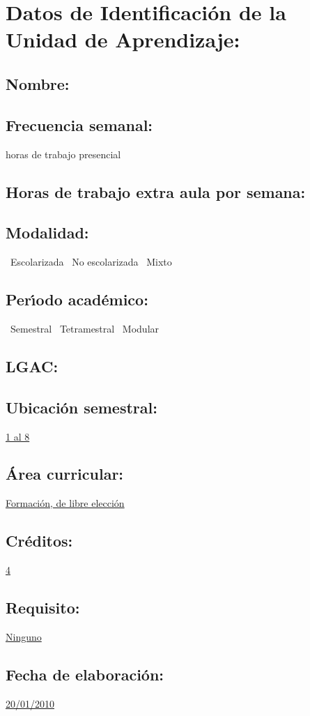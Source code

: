 \documentclass[10 pt]{article}
\begin{document}


\section{Datos de Identificaci\'{o}n de la Unidad de Aprendizaje:}
\subsection{Nombre:} 
\subsection{Frecuencia semanal:} horas de trabajo presencial 
\subsection{Horas de trabajo extra aula por semana:} 
\subsection{Modalidad:} \yes~Escolarizada \no~No escolarizada \no~Mixto
\subsection{Per\'{\i}odo acad\'{e}mico:} \yes~Semestral
\no~Tetramestral \no~Modular
\subsection{LGAC:} \underline{\seys}
\subsection{Ubicaci\'{o}n semestral:} \underline{1 al 8}
\subsection{\'{A}rea curricular:} \underline{Formaci\'{o}n, de libre elecci\'{o}n}
\subsection{Cr\'{e}ditos:} \underline{4}
\subsection{Requisito:} \underline{Ninguno}
\subsection{Fecha de elaboraci\'{o}n:} \underline{20/01/2010}
\end{document}
